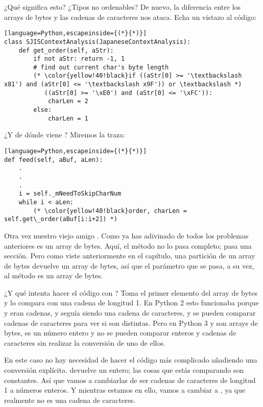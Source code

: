 ¿Qué significa esto? ¿Tipos no ordenables? De nuevo, la diferencia entre los arrays de bytes y las cadenas de caracteres nos ataca. Echa un vistazo al código:


\begin{lstlisting}[language=Python,escapeinside={(*}{*)}]
class SJISContextAnalysis(JapaneseContextAnalysis):
    def get_order(self, aStr):
        if not aStr: return -1, 1
        # find out current char's byte length
        (* \color{yellow!40!black}if ((aStr[0] >= '\textbackslash x81') and (aStr[0] <= '\textbackslash x9F')) or \textbackslash *)
           ((aStr[0] >= '\xE0') and (aStr[0] <= '\xFC')):
            charLen = 2
        else:
            charLen = 1
\end{lstlisting}

¿Y de dónde viene ? Miremos la traza:


\begin{lstlisting}[language=Python,escapeinside={(*}{*)}]
def feed(self, aBuf, aLen):
    .
    .
    .
    i = self._mNeedToSkipCharNum
    while i < aLen:
        (* \color{yellow!40!black}order, charLen = self.get\_order(aBuf[i:i+2]) *)
\end{lstlisting}

Otra vez nuestro viejo amigo . Como ya has adivinado de todos los problemas anteriores  es un array de bytes. Aquí, el método  no lo pasa completo; pasa una sección. Pero como viste anteriormente en el capítulo, una partición de un array de bytes devuelve un array de bytes, así que el parámetro  que se pasa, a su vez, al método  es un array de bytes.

¿Y qué intenta hacer el código con ? Toma el primer elemento del array de bytes y lo compara con una cadena de longitud 1. En Python 2 esto funcionaba porque  y  eran cadenas, y  seguía siendo una cadena de caracteres, y se pueden comparar cadenas de caracteres para ver si son distintas. Pero en Python 3  y  son arrays de bytes,  es un número entero y no se pueden comparar enteros y cadenas de caracteres sin realizar la conversión de uno de ellos.

En este caso no hay necesidad de hacer el código más complicado añadiendo una conversión explícita.  devuelve un entero; las cosas que estás comparando son constantes. Así que vamos a cambiarlas de ser cadenas de caracteres de longitud 1 a números enteros. Y mientras estamos en ello, vamos a cambiar  a , ya que realmente no es una cadena de caracteres.

